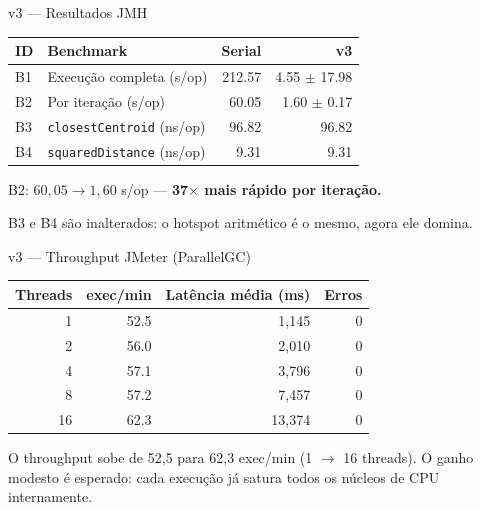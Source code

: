 \begin{frame}{v3 --- Resultados JMH}
    \begin{table}
        \centering
        \begin{tabular}{llrr}
            \toprule
            \textbf{ID} & \textbf{Benchmark} & \textbf{Serial} & \textbf{v3} \\
            \midrule
            B1 & Execução completa (s/op)                & 212.57 & \alert{4.55 $\pm$ 17.98} \\
            B2 & Por iteração (s/op)                     &  60.05 & \alert{1.60 $\pm$  0.17} \\
            B3 & \texttt{closestCentroid} (ns/op) & 96.82 & 96.82 \\
            B4 & \texttt{squaredDistance} (ns/op)  &  9.31 &  9.31 \\
            \bottomrule
        \end{tabular}
    \end{table}

    \medskip
    B2: $60{,}05 \to 1{,}60$ s/op --- \textbf{37$\times$ mais rápido por iteração.}

    B3 e B4 são inalterados: o hotspot aritmético é o mesmo, agora ele domina.
\end{frame}

\begin{frame}{v3 --- Throughput JMeter (ParallelGC)}
    \begin{table}
        \centering
        \begin{tabular}{rrrr}
            \toprule
            \textbf{Threads} & \textbf{exec/min} & \textbf{Latência média (ms)} & \textbf{Erros} \\
            \midrule
             1 &  52.5 &  1{,}145 & 0 \\
             2 &  56.0 &  2{,}010 & 0 \\
             4 &  57.1 &  3{,}796 & 0 \\
             8 &  57.2 &  7{,}457 & 0 \\
            16 &  62.3 & 13{,}374 & 0 \\
            \bottomrule
        \end{tabular}
    \end{table}

    \medskip
    O throughput sobe de 52,5 para 62,3 exec/min (1 $\to$ 16 threads).
    O ganho modesto é esperado: cada execução já satura todos os núcleos de CPU internamente.
\end{frame}


